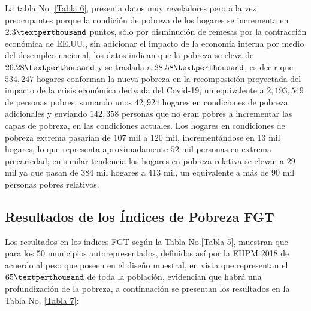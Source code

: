 La tabla No. \eqref{Tabla 6}, presenta datos muy reveladores pero a la vez preocupantes porque la condición de pobreza de los hogares se incrementa en $2.3 \textperthousand$ puntos, sólo por disminución de remesas por la contracción económica de EE.UU., sin adicionar el impacto de la economía interna por medio del desempleo nacional, los datos indican que la pobreza se eleva de $26.28 \textperthousand$ y se traslada a $28.58 \textperthousand$, es decir que $534,247$ hogares conforman la nueva pobreza en la recomposición proyectada del impacto de la crisis económica derivada del Covid-19, un equivalente a $2,193,549$ de personas pobres, sumando unos $42,924$ hogares en condiciones de pobreza adicionales y enviando $142,358$ personas que no eran pobres a incrementar las capas de pobreza, en las condiciones actuales. Los hogares en condiciones de pobreza extrema pasarían de $107$ mil a $120$ mil, incrementándose en $13$ mil hogares, lo que representa aproximadamente $52$ mil personas en extrema precariedad; en similar tendencia los hogares en pobreza relativa se elevan a $29$ mil ya que pasan de 384 mil hogares a 413 mil, un equivalente a más de $90$ mil personas pobres relativos. 

\subsection{Resultados de los Índices de Pobreza FGT}

Los resultados en los índices FGT según la Tabla No.\eqref{Tabla 5}, muestran que para los 50 municipios autorepresentados, definidos así por la EHPM 2018 de acuerdo al peso que poseen en el diseño muestral, en vista que representan el $65 \textperthousand$ de toda la población, evidencian que habrá una profundización de la pobreza, a continuación se presentan los resultados en la Tabla No. \eqref{Tabla 7}:

